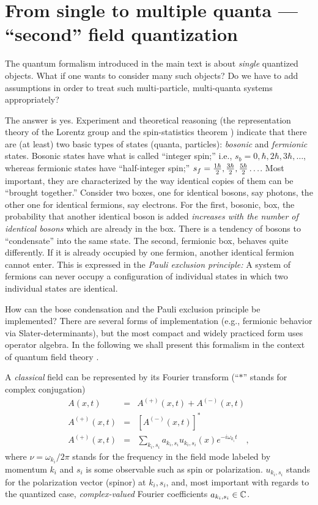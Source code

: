 \section{From single to multiple quanta --- ``second'' field
quantization}
\label{a:2}


The quantum formalism introduced in the main text is about {\em single}
quantized
objects. What if one wants to consider many such objects? Do we have to
add assumptions in order to treat such multi-particle, multi-quanta
systems appropriately?

The answer is yes. Experiment and theoretical reasoning (the
representation theory of the Lorentz group \cite{urbantke} and the
spin-statistics
 theorem \cite{jauch-rohrlich,lurie,bogol-shi,itzy}) indicate that
there are
(at least) two basic types of states (quanta, particles):
{\em bosonic} and
{\em fermionic} states.
Bosonic states have what is called ``integer spin;'' i.e.,
$s_b=0,\hbar ,2 \hbar ,3\hbar ,\ldots$, whereas fermionic states have
``half-integer spin;''
$s_f={1\hbar \over 2},{3\hbar \over2},{5\hbar \over 2}\ldots$.
Most important, they are characterized by the way identical copies of
them can be ``brought together.''
Consider two boxes, one for identical bosons, say photons, the other one
for identical fermions, say electrons.
For the first, bosonic, box, the probability that another identical
boson is added {\em increases with the number of identical bosons} which
are already in the box. There is a tendency of bosons to ``condensate''
into the same state.
The second, fermionic box, behaves quite differently. If it is already
occupied by one fermion, another identical fermion cannot enter. This is
expressed in the {\em Pauli exclusion principle:}
A system of fermions can never occupy a configuration of individual
states in which two individual states are identical.

How can the bose condensation and the Pauli exclusion principle be
implemented? There are several forms of implementation (e.g.,
fermionic behavior via Slater-determinants), but the most compact and
widely practiced form uses operator algebra. In the following we shall
present this formalism in the context of quantum field theory
\cite{har,lipkin,jauch-rohrlich,lurie,bogol-shi,itzy,glauber}.

A {\em classical} field can be represented by its Fourier transform
(``$\ast$'' stands for complex conjugation)
\begin{eqnarray}
A(x,t)&=&A^{(+)}(x,t)
+
A^{(-)}(x,t)\\
A^{(+)}(x,t)
&=&
[A^{(-)}(x,t)]^\ast\\
A^{(+)}(x,t)
&=&
\sum_{k_i,s_i} a_{k_i,s_i}u_{k_i,s_i}(x)e^{-i\omega_{k_i} t}\quad ,
\label{el:a1}
\end{eqnarray}
where $\nu =\omega_{k_i}/2\pi$ stands for the frequency in the field
mode
labeled by  momentum $k_i$ and
$s_i$ is some observable such as spin or
polarization.
$u_{k_i,s_i}$ stands for the polarization vector
(spinor) at $k_i,s_i$,
and, most important with regards to the quantized case, {\em
complex-valued} Fourier coefficients $a_{k_i,s_i}\in {\Bbb C}$.

